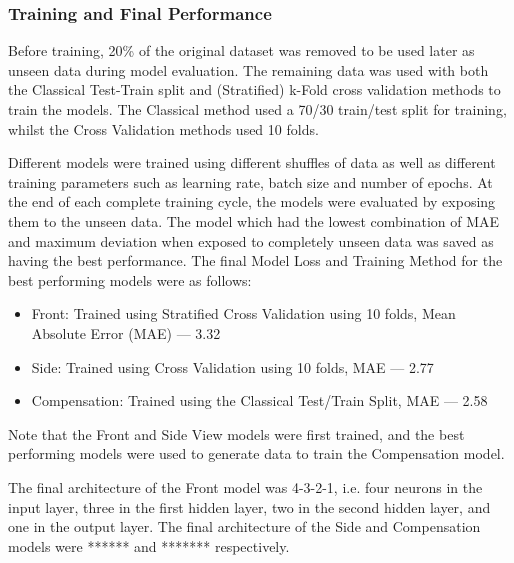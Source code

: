 \documentclass[conference]{IEEEtran}
\begin{document}
\subsubsection{Training and Final Performance} \label{trainingandperformance}
Before training, 20\% of the original dataset was removed to be used later as unseen data during model evaluation.
The remaining data was used with both the Classical Test-Train split and (Stratified) k-Fold cross validation methods to train the models.
The Classical method used a 70/30 train/test split for training, whilst the Cross Validation methods used 10 folds.

Different models were trained using different shuffles of data as well as different training parameters such as learning rate, batch size and number of epochs.
At the end of each complete training cycle, the models were evaluated by exposing them to the unseen data.
The model which had the lowest combination of MAE and maximum deviation when exposed to completely unseen data was saved as having the best performance.
The final Model Loss and Training Method for the best performing models were as follows:
\begin{itemize}
	\item Front: Trained using Stratified Cross Validation using 10 folds, Mean Absolute Error (MAE) — 3.32
	\item Side: Trained using Cross Validation using 10 folds, MAE — 2.77
	\item Compensation: Trained using the Classical Test/Train Split, MAE — 2.58
\end{itemize}
Note that the Front and Side View models were first trained, and the best performing models were used to generate data to train the Compensation model.

The final architecture of the Front model was 4-3-2-1, i.e. four neurons in the input layer, three in the first hidden layer, two in the second hidden layer, and one in the output layer.
The final architecture of the Side and Compensation models were ****** and ******* respectively.
\end{document}

